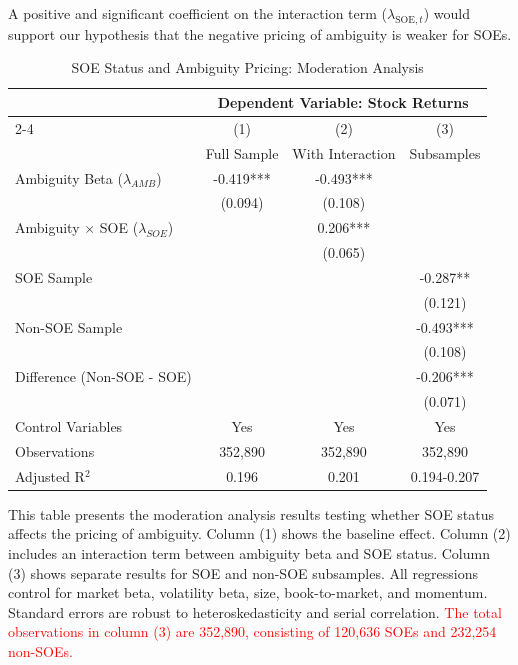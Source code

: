 \documentclass[preprint,12pt,authoryear]{elsarticle}
\begin{document}
A positive and significant coefficient on the interaction term ($\lambda_{\text{SOE},t}$) would support our hypothesis that the negative pricing of ambiguity is weaker for SOEs.

\begin{table}[htbp]
\centering
\caption{SOE Status and Ambiguity Pricing: Moderation Analysis}
\label{tab:soe_moderation}
\begin{threeparttable}
\begin{tabular*}{\textwidth}{@{\extracolsep{\fill}} lccc @{\extracolsep{\fill}}}
\toprule
& \multicolumn{3}{c}{Dependent Variable: Stock Returns} \\
\cmidrule(lr){2-4}
& (1) & (2) & (3) \\
& Full Sample & With Interaction & Subsamples \\
\midrule
\midrule
Ambiguity Beta ($\lambda_{AMB}$) & -0.419*** & -0.493*** &  \\
& (0.094) & (0.108) &  \\
\midrule
Ambiguity $\times$ SOE ($\lambda_{SOE}$) & & 0.206*** &  \\
& & (0.065) &  \\
\midrule
SOE Sample & & & -0.287** \\
& & & (0.121) \\
\midrule
Non-SOE Sample & & & -0.493*** \\
& & & (0.108) \\
\midrule
Difference (Non-SOE - SOE) & & & -0.206*** \\
& & & (0.071) \\
\midrule
Control Variables & Yes & Yes & Yes \\
\midrule
Observations & 352,890 & 352,890 & 352,890 \\
Adjusted R$^2$ & 0.196 & 0.201 & 0.194-0.207 \\
\bottomrule
\end{tabular*}
\begin{tablenotes}[flushleft]
\small
\item[] This table presents the moderation analysis results testing whether SOE status affects the pricing of ambiguity. Column (1) shows the baseline effect. Column (2) includes an interaction term between ambiguity beta and SOE status. Column (3) shows separate results for SOE and non-SOE subsamples. All regressions control for market beta, volatility beta, size, book-to-market, and momentum. Standard errors are robust to heteroskedasticity and serial correlation. \textcolor{red}{The total observations in column (3) are 352,890, consisting of 120,636 SOEs and 232,254 non-SOEs.}
\end{tablenotes}
\end{threeparttable}
\end{table}
\end{document}
